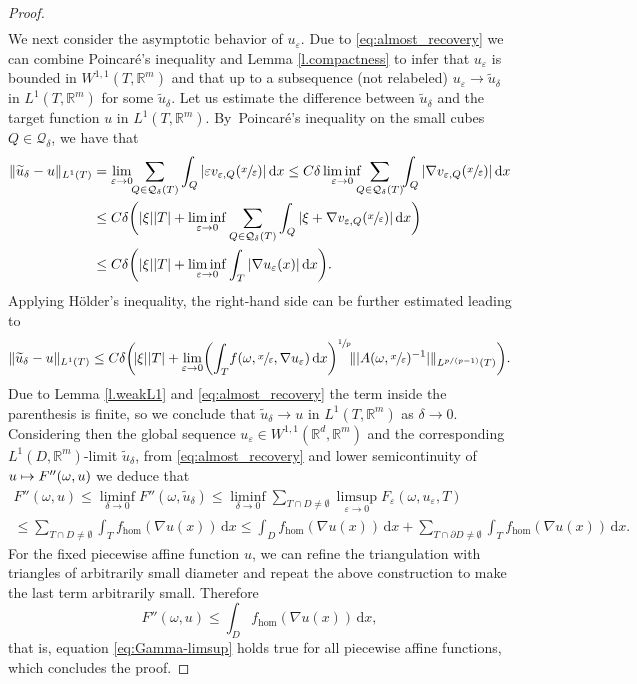 \documentclass[JEP,XML,SOM,Unicode,published]{cedram}
\def\mto{\mathchoice{\longmapsto}{\mapsto}{\mapsto}{\mapsto}}
\theoremstyle{definition}
\let\e\varepsilon
\let\w\omega
\newcommand{\dx}{\,\mathrm{d}x}
\newcommand{\R}{\mathbb{R}}
\begin{document}
\begin{proof}
\begin{multline}
\end{multline}
We next consider the asymptotic behavior of $u_{\e}$. Due to \eqref{eq:almost_recovery} we can combine Poincaré's inequality and Lemma \ref{l.compactness} to infer that $u_{\e}$ is bounded in $W^{1,1}(T,\R^m)$ and that up to a subsequence (not relabeled) $u_{\e}\to \widetilde{u}_{\delta}$ in $L^1(T,\R^m)$ for some $\widetilde{u}_{\delta}$. Let us estimate the difference between $\widetilde{u}_{\delta}$ and the target function $u$ in $L^1(T,\R^m)$. By~Poincaré's inequality on the small cubes $Q\in\mathcal{Q}_{\delta}$, we have that
\begin{align*}
\|\widetilde{u}_{\delta}-u\|_{L^1(T)}&=\lim_{\e\to 0}\hspace*{-1mm}\sum_{Q\in\mathcal{Q}_{\delta}(T)} \int_Q|\e v_{\e,Q}(\sfrac{x}{\e})|\dx\leq C\delta\liminf_{\e\to 0}\hspace*{-2mm}\sum_{Q\in\mathcal{Q}_{\delta}(T)}\hspace*{-1mm}\int_{Q}|\nabla v_{\e,Q}(\sfrac{x}{\e})|\dx
\\
&\leq C\delta \biggl(|\xi||T|+\liminf_{\e\to 0}\sum_{Q\in\mathcal{Q}_{\delta}(T)}\int_{Q}|\xi+\nabla v_{\e,Q}(\sfrac{x}{\e})|\dx\biggr)
\\
&\leq C\delta \biggl(|\xi||T|+\liminf_{\e\to 0}\int_{T}|\nabla u_{\e}(x)|\dx\biggr).
\end{align*}
Applying Hölder's inequality, the right-hand side can be further estimated leading to
\begin{equation*}
\|\widetilde{u}_{\delta}-u\|_{L^1(T)}\leq C\delta\biggl(\!|\xi||T|+\lim_{\e\to 0}\biggl(\int_{T}\!f(\w,\sfrac{x}{\e},\nabla u_{\e})\dx\biggr)^{\sfrac{1}{p}}\!\||A(\w,\sfrac{x}{\e})^{-1}|\|_{L^{p/(p-1)}(T)}\biggr).
\end{equation*}
Due to Lemma \ref{l.weakL1} and \eqref{eq:almost_recovery} the term inside the parenthesis is finite, so we conclude that $\widetilde{u}_{\delta}\to u$ in $L^1(T,\R^m)$ as $\delta\to 0$. Considering then the global sequence $u_{\e}\in W^{1,1}(\R^d,\R^m)$ and the corresponding $L^1(D,\R^m)$-limit $\widetilde{u}_{\delta}$, from \eqref{eq:almost_recovery} and lower semicontinuity of $u\mto F''(\w,u)$ we deduce that
\begin{multline*}
F''(\w,u)\leq\liminf_{\delta\to 0}F''(\w,\widetilde{u}_{\delta})\leq\liminf_{\delta\to 0} \sum_{T\cap D\neq\emptyset}\limsup_{\e\to 0}F_{\e}(\w,u_{\e},T)
\\
\leq  \sum_{T\cap D\neq\emptyset}\int_Tf_{\hom}(\nabla u(x))\dx
\leq \int_D f_{\hom}(\nabla u(x))\dx+\sum_{T\cap\partial D\neq\emptyset}\int_Tf_{\hom}(\nabla u(x))\dx.
\end{multline*}
For the fixed piecewise affine function $u$, we can refine the triangulation with triangles of arbitrarily small diameter and repeat the above construction to make the last term arbitrarily small. Therefore
\begin{equation*}
F''(\w,u)\leq \int_{D}f_{\hom}(\nabla u(x))\dx,
\end{equation*}
that is, equation \eqref{eq:Gamma-limsup} holds true for all piecewise affine functions, which concludes the proof.
\end{proof}
\end{document}
